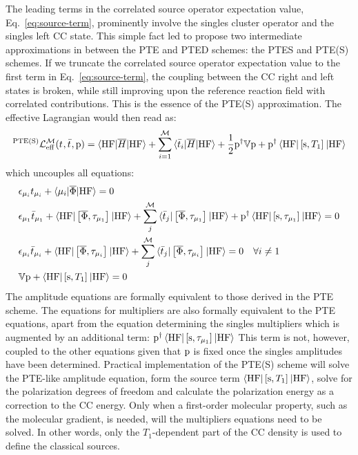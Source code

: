 The leading terms in the correlated source operator expectation
value, Eq.~\eqref{eq:source-term}, prominently involve the singles
cluster operator and the singles left \acs{CC} state.
This simple fact led \citeauthor{Caricato2011-tx} to propose two
intermediate approximations in between the \acs{PTE} and \acs{PTED}
schemes: the \acs{PTES} and \acs{PTE(S)} schemes.
If we truncate the correlated source operator expectation value
to the first term in Eq.~\eqref{eq:source-term}, the coupling between
the \acs{CC} right and left states is broken, while still improving upon the
reference reaction field with correlated contributions.
This is the essence of the \acs{PTE(S)} approximation. The effective
Lagrangian would then read as:
\begin{equation}\label{eq:ptes-cc}
  ^{\mathrm{PTE(S)}}\mathcal{L}^\mathcal{M}_\mathrm{eff}(t_{}, \bar{t}_{}, \mathrm{p}) =
  \braket{\mathrm{HF} | \overline{H} | \mathrm{HF}}
  + \sum_{i=1}^{\mathcal{M}}\braket{\bar{t}_{i} | \overline{H} | \mathrm{HF}}
  + \frac{1}{2}\mathrm{p}^\dagger\mathbb{V}\mathrm{p} + \mathrm{p}^\dagger
  \braket{\mathrm{HF} | \left[ \mathrm{s}, T_1 \right]^{} | \mathrm{HF}}
\end{equation}
which uncouples all equations:
\begin{subequations}
  \begin{align}
   &\epsilon_{\mu_i}t_{\mu_i} + \braket{\mu_i | \overline{\Phi} | \mathrm{HF}}
   = 0 \\
    &\epsilon_{\mu_1}\bar{t}_{\mu_1} +
    \braket{\mathrm{HF} | \left[ \overline{\Phi}, \tau_{\mu_1} \right]^{} | \mathrm{HF}} +
    \sum_{j}^{\mathcal{M}}\braket{\bar{t}_{j} |
    \left[ \overline{\Phi}, \tau_{\mu_1} \right]^{} | \mathrm{HF}}
    + \mathrm{p}^\dagger
    \braket{\mathrm{HF} | \left[ \mathrm{s}, \tau_{\mu_1} \right]^{} | \mathrm{HF}}
    = 0 \\
    &\epsilon_{\mu_i}\bar{t}_{\mu_i} +
    \braket{\mathrm{HF} | \left[ \overline{\Phi}, \tau_{\mu_i} \right]^{} | \mathrm{HF}} +
    \sum_{j}^{\mathcal{M}}\braket{\bar{t}_{j} |
    \left[ \overline{\Phi}, \tau_{\mu_i} \right]^{} | \mathrm{HF}}
    = 0  \quad \forall i \neq 1 \\
    &\mathbb{V}\mathrm{p} + \braket{\mathrm{HF} | \left[ \mathrm{s}, T_1 \right]^{} | \mathrm{HF}} = 0
  \end{align}
\end{subequations}
The amplitude equations are formally equivalent to those derived in the
\acs{PTE} scheme. The equations for multipliers are also formally
equivalent to the \acs{PTE} equations, apart from the equation
determining the singles multipliers which is augmented by an additional term:
$\mathrm{p}^\dagger\braket{\mathrm{HF} | \left[ \mathrm{s}, \tau_{\mu_1} \right]^{} |
\mathrm{HF}}$
This term is not, however, coupled to the other equations given that
$\mathrm{p}$ is fixed once the singles amplitudes have been determined.
Practical implementation of the \acs{PTE(S)} scheme will solve the
\acs{PTE}-like amplitude equation, form the source term
$\braket{\mathrm{HF} | \left[ \mathrm{s}, T_1 \right]^{} | \mathrm{HF}}$, solve for
the polarization degrees of freedom and calculate the polarization
energy as a correction to the \acs{CC} energy.
Only when a first-order molecular property, such as the molecular
gradient, is needed, will the multipliers equations need to be solved.
In other words, only the $T_1$-dependent part of the \acs{CC} density is
used to define the classical sources.

